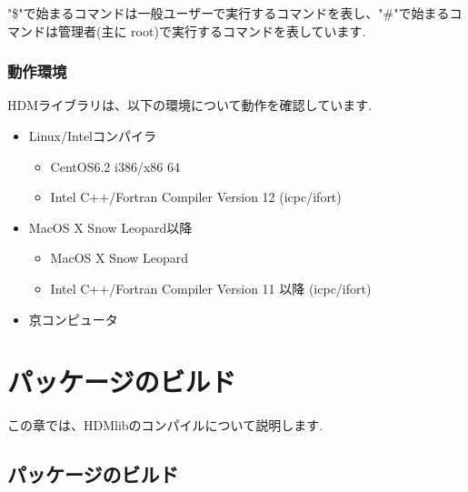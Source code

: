\documentclass[twoside]{jbook}
\begin{document}
 "\$"で始まるコマンドは一般ユーザーで実行するコマンドを表し、"\#"で始まるコマンドは管理者(主に root)で実行するコマンドを表しています. 

\subsection{動作環境}
HDMライブラリは、以下の環境について動作を確認しています. \\
\begin{itemize}
	\item Linux/Intelコンパイラ
	\begin{itemize}
		\item CentOS6.2 i386/x86 64
		\item Intel C++/Fortran Compiler Version 12 (icpc/ifort)
	\end{itemize}
	\item MacOS X Snow Leopard以降
	\begin{itemize}
		\item MacOS X Snow Leopard
		\item Intel C++/Fortran Compiler Version 11 以降 (icpc/ifort)
	\end{itemize}
	\item 京コンピュータ
\end{itemize}

\chapter{パッケージのビルド}
この章では、HDMlibのコンパイルについて説明します. 
\newpage
\section{パッケージのビルド}
\end{document}
